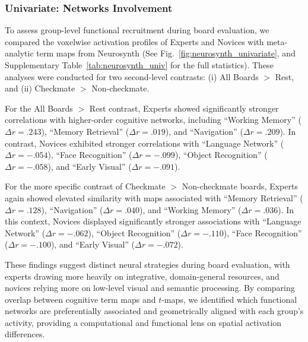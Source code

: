 \documentclass[preprint,12pt]{elsarticle}
\begin{document}
\subsubsection{Univariate: Networks Involvement}
To assess group-level functional recruitment during board evaluation, we compared the voxelwise activation profiles of Experts and Novices with meta-analytic term maps from Neurosynth (See Fig.~\ref{fig:neurosynth_univariate}, and  Supplementary Table~\ref{tab:neurosynth_univ} for the full statistics). These analyses were conducted for two second-level contrasts: (i) All Boards $>$ Rest, and (ii) Checkmate $>$ Non-checkmate.

For the All Boards $>$ Rest contrast, Experts showed significantly stronger correlations with higher-order cognitive networks, including ``Working Memory'' ($\Delta r = .243$), ``Memory Retrieval'' ($\Delta r = .019$), and  ``Navigation'' ($\Delta r = .209$). In contrast, Novices exhibited stronger correlations with ``Language Network'' ($\Delta r = -.054$), ``Face Recognition'' ($\Delta r = -.099$), ``Object Recognition'' ($\Delta r = -.058$), and ``Early Visual'' ($\Delta r = -.091$).

For the more specific contrast of Checkmate $>$ Non-checkmate boards, Experts again showed elevated similarity with maps associated with ``Memory Retrieval'' ($\Delta r = .128$), ``Navigation'' ($\Delta r = .040$), and ``Working Memory'' ($\Delta r = .036$). In this context, Novices displayed significantly stronger associations with ``Language Network'' ($\Delta r = -.062$), ``Object Recognition'' ($\Delta r = -.110$), ``Face Recognition'' ($\Delta r = -.100$), and ``Early Visual'' ($\Delta r = -.072$).

These findings suggest distinct neural strategies during board evaluation, with experts drawing more heavily on integrative, domain-general resources, and novices relying more on low-level visual and semantic processing. By comparing overlap between cognitive term maps and $t$-maps, we identified which functional networks are preferentially associated and geometrically aligned with each group’s activity, providing a computational and functional lens on spatial activation differences.
\end{document}
